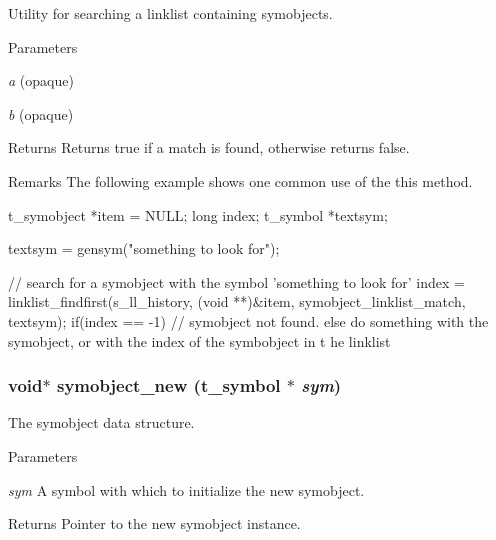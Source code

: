 Utility for searching a linklist containing symobjects. 
\begin{DoxyParams}{Parameters}
\item[{\em a}](opaque) \item[{\em b}](opaque) \end{DoxyParams}
\begin{DoxyReturn}{Returns}
Returns true if a match is found, otherwise returns false.
\end{DoxyReturn}
\begin{DoxyRemark}{Remarks}
The following example shows one common use of the this method. 
\begin{DoxyCode}
    t_symobject *item = NULL;
    long        index;
    t_symbol    *textsym;
    
    textsym = gensym("something to look for");

    // search for a symobject with the symbol 'something to look for'
    index = linklist_findfirst(s_ll_history, (void **)&item, 
      symobject_linklist_match, textsym);
    if(index == -1){
        // symobject not found.
    }
    else{
        do something with the symobject, or with the index of the symbobject in t
      he linklist
    }   
\end{DoxyCode}
 
\end{DoxyRemark}
\hypertarget{group__symobject_gac66ae5925bb38fa0914f14dcc8172e2d}{
\subsubsection[{symobject\_\-new}]{\setlength{\rightskip}{0pt plus 5cm}void$\ast$ symobject\_\-new ({\bf t\_\-symbol} $\ast$ {\em sym})}}
\label{group__symobject_gac66ae5925bb38fa0914f14dcc8172e2d}


The symobject data structure. 
\begin{DoxyParams}{Parameters}
\item[{\em sym}]A symbol with which to initialize the new symobject. \end{DoxyParams}
\begin{DoxyReturn}{Returns}
Pointer to the new symobject instance. 
\end{DoxyReturn}
